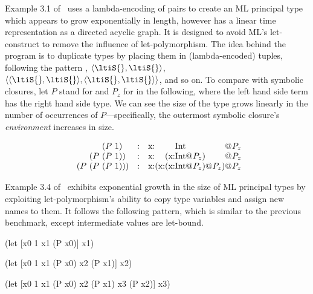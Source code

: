 \documentclass[11pt,final]{iuthesis}
\begin{document}
Example 3.1 of~\cite{kanellakis1989polymorphic} uses a lambda-encoding of pairs to create an ML principal type
which appears to grow exponentially in length, however has a linear time representation as a directed acyclic graph.
It is designed to avoid ML's let-construct to remove the influence of let-polymorphism.
The idea behind the program is to duplicate types \ltiS{} by placing them in (lambda-encoded) tuples,
following the pattern \ltiS{}, $\langle\ltiS{},\ltiS{}\rangle$, $\langle\langle\ltiS{},\ltiS{}\rangle,\langle\ltiS{},\ltiS{}\rangle\rangle$,
and so on.
To compare with symbolic closures,
let $P$ stand for 
and $P_z$ for  in the following, where the left
hand side term has the right hand side type.
We can see the size of the type grows linearly in the number of occurrences of $P$---specifically,
the outermost symbolic closure's \emph{environment} increases in size.

{
\[
\begin{array}{c@{}c@{}c@{}c@{}ccr@{}r@{}r@{}r@{}r@{}r@{}r@{}r@{}r}
  &&{(P\ 1)}&&        & : &    \ltiClosure{\hastype{\text{x}}{&&&\text{Int}&&}&}{P_z}\\
  &{(P\ } &{(P\ 1)}& {)}&    & : &   \ltiClosure{\hastype{\text{x}}
                                                 {&&(\ltiClosure{\hastype{\text{x}}{&\text{Int}&}}{{P_z}})&&}}
                                                {P_z}\\
{(P\ }&{(P\ }&{(P\ 1)}&{)}&{)}    & : &   \ltiClosure{\hastype{\text{x}}
                                                      {&(\ltiClosure{\hastype{\text{x}}{&(\ltiClosure{\hastype{\text{x}}{&\text{Int}&}}{P_z})&}}{P_z})}&}
                                                     {P_z}
\end{array}
\]
}

Example 3.4 of~\cite{kanellakis1989polymorphic}
exhibits exponential growth in the size of ML principal types by exploiting
let-polymorphism's ability to copy type variables and assign new names to them.
It follows the following pattern, which is similar to the previous benchmark, except
intermediate values are let-bound.

\begin{minipage}[t]{0.3\linewidth}
\begin{cljlisting}
(let [x0 1
      x1 (P x0)]
  x1)
\end{cljlisting}
\end{minipage}
%
\begin{minipage}[t]{0.3\linewidth}
\begin{cljlisting}
(let [x0 1
      x1 (P x0)
      x2 (P x1)]
  x2)
\end{cljlisting}
\end{minipage}
%
\begin{minipage}[t]{0.3\linewidth}
\begin{cljlisting}
(let [x0 1
      x1 (P x0)
      x2 (P x1)
      x3 (P x2)]
  x3)
\end{cljlisting}
\end{minipage}
\end{document}
